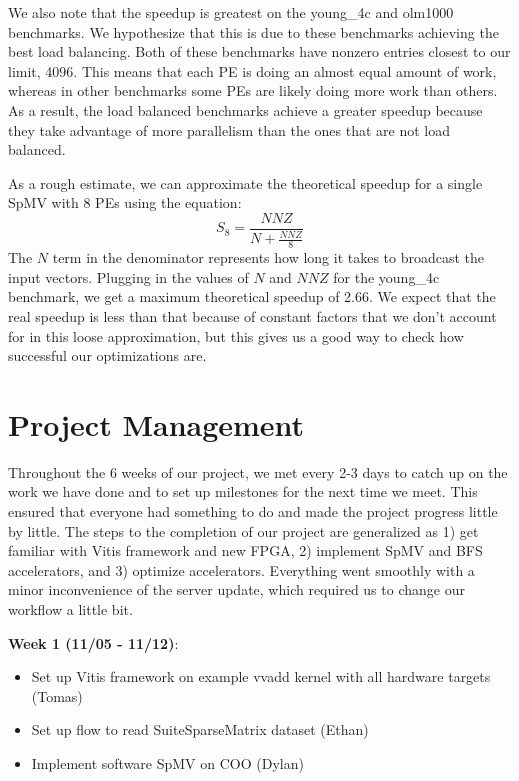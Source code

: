 \documentclass[10pt]{article}
\begin{document}
\noindent We also note that the speedup is greatest on the young\_4c and olm1000 benchmarks. We hypothesize that this is due to these
benchmarks achieving the best load balancing. Both of these benchmarks have nonzero entries closest to our limit, 4096. This
means that each PE is doing an almost equal amount of work, whereas in other benchmarks some PEs are likely doing more work
than others. As a result, the load balanced benchmarks achieve a greater speedup because they take advantage of more parallelism
than the ones that are not load balanced. \newline

\noindent As a rough estimate, we can approximate the theoretical speedup for a single SpMV with 8 PEs using the equation: 
\[
  S_8 = \frac{\mathit{NNZ}}{N + \frac{\mathit{NNZ}}{8}}
\]
The $N$ term in the denominator represents how long it takes to broadcast the
input vectors. Plugging in the values of $N$ and $\mathit{NNZ}$ for the
young\_4c benchmark, we get a maximum theoretical speedup of 2.66. We expect
that the real speedup is less than that because of constant factors that we
don't account for in this loose approximation, but this gives us a good way to
check how successful our optimizations are.

\section{Project Management}

\noindent Throughout the 6 weeks of our project, we met every 2-3 days to catch up on the work we have done and to set up
milestones for the next time we meet. This ensured that everyone had something to do and made the project
progress little by little. The steps to the completion of our project are generalized as 1) get familiar with
Vitis framework and new FPGA, 2) implement SpMV and BFS accelerators, and 3) optimize accelerators. Everything went
smoothly with a minor inconvenience of the server update, which required us to change our workflow a little bit. \newline

\noindent \textbf{Week 1 (11/05 - 11/12)}:
\begin{itemize}
  \item Set up Vitis framework on example vvadd kernel with all hardware targets (Tomas)
  \item Set up flow to read SuiteSparseMatrix dataset (Ethan)
  \item Implement software SpMV on COO (Dylan)
\end{itemize}
\end{document}
